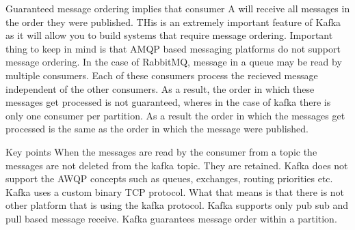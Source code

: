 Guaranteed message ordering implies that consumer A will receive all messages in the order they were published.
THis is an extremely important feature of Kafka as it will allow you to build systems that require message ordering.
Important thing to keep in mind is that AMQP based messaging platforms do not support message ordering.
In the case of RabbitMQ, message in a queue may be read by multiple consumers.
Each of these consumers process the recieved message independent of the other consumers.
As a result, the order in which these messages get processed is not guaranteed, wheres in the case of kafka there is only one consumer per partition.
As a result the order in which the messages get processed is the same as the order in which the message were published.

Key points
When the messages are read by the consumer from a topic the messages are not deleted from the kafka topic. They are retained.
Kafka does not support the AWQP concepts such as queues, exchanges, routing priorities etc.
Kafka uses a custom binary TCP protocol.
What that means is that there is not other platform that is using the kafka protocol.
Kafka supports only pub sub and pull based message receive.
Kafka guarantees message order within a partition.



